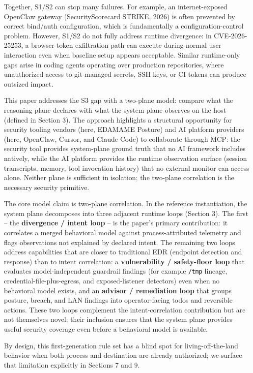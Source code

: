 \documentclass[
]{article}
\begin{document}
Together, S1/S2 can stop many failures. For example, an internet-exposed
OpenClaw gateway (SecurityScorecard STRIKE, 2026) is often prevented by
correct bind/auth configuration, which is fundamentally a
configuration-control problem. However, S1/S2 do not fully address
runtime divergence: in CVE-2026-25253, a browser token exfiltration path
can execute during normal user interaction even when baseline setup
appears acceptable. Similar runtime-only gaps arise in coding agents
operating over production repositories, where unauthorized access to
git-managed secrets, SSH keys, or CI tokens can produce outsized impact.

This paper addresses the S3 gap with a two-plane model: compare what the
reasoning plane declares with what the system plane observes on the host
(defined in Section 3). The approach highlights a structural opportunity
for security tooling vendors (here, EDAMAME Posture) and AI platform
providers (here, OpenClaw, Cursor, and Claude Code) to collaborate
through MCP: the security tool provides system-plane ground truth that
no AI framework includes natively, while the AI platform provides the
runtime observation surface (session transcripts, memory, tool
invocation history) that no external monitor can access alone. Neither
plane is sufficient in isolation; the two-plane correlation is the
necessary security primitive.

The core model claim is two-plane correlation. In the reference
instantiation, the system plane decomposes into three adjacent runtime
loops (Section 3). The first -- the \textbf{divergence / intent loop} --
is the paper's primary contribution: it correlates a merged behavioral
model against process-attributed telemetry and flags observations not
explained by declared intent. The remaining two loops address
capabilities that are closer to traditional EDR (endpoint detection and
response) than to intent correlation: a \textbf{vulnerability /
safety-floor loop} that evaluates model-independent guardrail findings
(for example \texttt{/tmp} lineage, credential-file-plus-egress, and
exposed-listener detectors) even when no behavioral model exists, and an
\textbf{advisor / remediation loop} that groups posture, breach, and LAN
findings into operator-facing todos and reversible actions. These two
loops complement the intent-correlation contribution but are not
themselves novel; their inclusion ensures that the system plane provides
useful security coverage even before a behavioral model is available.

By design, this first-generation rule set has a blind spot for
living-off-the-land behavior when both process and destination are
already authorized; we surface that limitation explicitly in Sections 7
and 9.
\end{document}
